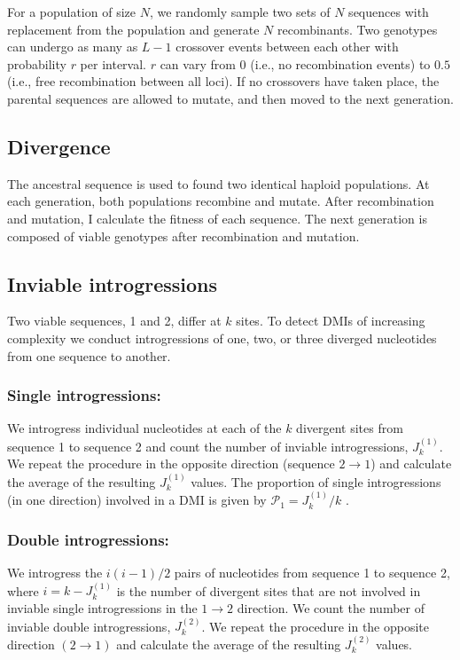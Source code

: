 \documentclass[9pt,lineno]{elife}
\begin{document}
For a population of size $N$, we randomly sample two sets of $N$ sequences with replacement from the population and generate $N$ recombinants. Two genotypes can undergo as many as $L-1$ crossover events between each other with probability $r$ per interval. $r$ can vary from $0$ (i.e., no recombination events) to $0.5$ (i.e., free recombination between all loci). If no crossovers have taken place, the parental sequences are allowed to mutate, and then moved to the next generation.

\subsection{Divergence}

The ancestral sequence is used to found two identical haploid populations. At each generation, both populations recombine and mutate. After recombination and mutation, I calculate the fitness of each sequence. The next generation is composed of viable genotypes after recombination and mutation.  

\subsection*{Inviable introgressions}

Two viable sequences, 1 and 2, differ at $k$ sites.  To detect DMIs of increasing complexity we conduct introgressions of one, two, or three diverged nucleotides from one sequence to another.

\subsubsection{Single introgressions:}
We introgress individual nucleotides at each of the $k$ divergent sites from sequence 1 to sequence 2 and count the number of inviable introgressions, $J_{k}^{(1)}$.  We repeat the procedure in the opposite direction (sequence $2\to1$) and calculate the average of the resulting $J_{k}^{(1)}$ values.  The proportion of single introgressions (in one direction) involved in a DMI is given by $\mathcal P_{1} = J_{k}^{(1)} / k$ \citep{Welch2004}.


\subsubsection{Double introgressions:}
We introgress the $i(i-1)/2$ pairs of nucleotides from sequence 1 to sequence 2, where $i = k - J_{k}^{(1)}$ is the number of divergent sites that are not involved in inviable single introgressions in the $1\to 2$ direction.  We count the number of inviable double introgressions, $J_{k}^{(2)}$.  We repeat the procedure in the opposite direction $(2\to1)$ and calculate the average of the resulting $J_{k}^{(2)}$ values.
\end{document}
